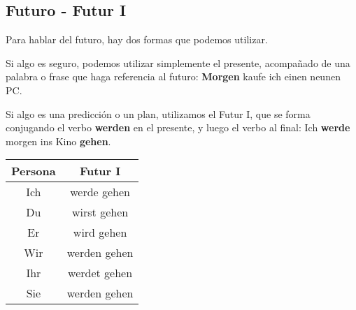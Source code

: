 \subsection{Futuro - Futur I}
Para hablar del futuro, hay dos formas que podemos utilizar.

Si algo es seguro, podemos utilizar simplemente el presente, acompañado de una palabra o frase que haga referencia al futuro: \textbf{Morgen} kaufe ich einen neunen PC.

Si algo es una predicción o un plan, utilizamos el Futur I, que se forma conjugando el verbo \textbf{werden} en el presente, y luego el verbo al final: Ich \textbf{werde} morgen ins Kino \textbf{gehen}.

\begin{tabular}{|c|c|}
\hline
\textbf{Persona} & \textbf{Futur I}\\
\hline
Ich & werde gehen  \\
Du  & wirst gehen  \\
Er  & wird gehen   \\
Wir & werden gehen \\
Ihr & werdet gehen \\
Sie & werden gehen \\
\hline
\end{tabular}


\clearpage

